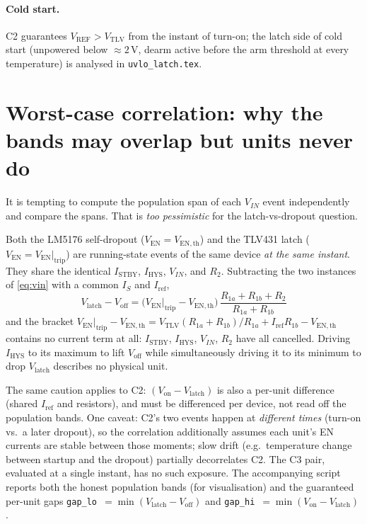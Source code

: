 \documentclass[11pt]{article}
\newcommand{\volt}{\mathrm{V}}\newcommand{\ampere}{\mathrm{A}}
\newcommand{\SI}[2]{\ensuremath{#1\,#2}}
\newcommand{\Ven}{V_{\mathrm{EN}}}
\newcommand{\Vref}{V_{\mathrm{REF}}}
\newcommand{\Vtlv}{V_{\mathrm{TLV}}}
\newcommand{\Vth}{V_{\mathrm{EN,th}}}
\newcommand{\Iref}{I_{\mathrm{ref}}}
\newcommand{\Istby}{I_{\mathrm{STBY}}}
\newcommand{\Ihys}{I_{\mathrm{HYS}}}
\newcommand{\Rone}{R_{1a}}
\newcommand{\Rtwo}{R_{1b}}
\newcommand{\Rt}{R_{2}}
\newcommand{\Von}{V_{\mathrm{on}}}
\newcommand{\Voff}{V_{\mathrm{off}}}
\newcommand{\Vlatch}{V_{\mathrm{latch}}}
\begin{document}
\paragraph{Cold start.} C2 guarantees $\Vref>\Vtlv$ from the instant of
turn-on; the latch side of cold start (unpowered below $\approx\SI{2}{\volt}$,
dearm active before the arm threshold at every temperature) is analysed in
\texttt{uvlo\_latch.tex}.

\section{Worst-case correlation: why the bands may overlap but units never do}
\label{sec:corr}

It is tempting to compute the population span of each $V_{IN}$ event
independently and compare the spans. That is \emph{too pessimistic} for the
latch-vs-dropout question.

Both the LM5176 self-dropout ($\Ven=\Vth$) and the TLV431 latch
($\Ven=\Ven|_{\mathrm{trip}}$) are running-state events of the same device
\emph{at the same instant}. They share the identical $\Istby$, $\Ihys$,
$V_{IN}$, and $\Rt$. Subtracting the two instances of \eqref{eq:vin} with a
common $I_S$ and $\Iref$,
\begin{equation}
\boxed{\;\Vlatch-\Voff
=\big(\Ven|_{\mathrm{trip}}-\Vth\big)\,\frac{\Rone+\Rtwo+\Rt}{\Rone+\Rtwo}\;}
\label{eq:gap}
\end{equation}
and the bracket
$\Ven|_{\mathrm{trip}}-\Vth=\Vtlv(\Rone+\Rtwo)/\Rone+\Iref\Rtwo-\Vth$
contains no current term at all: $\Istby$, $\Ihys$, $V_{IN}$, $\Rt$ have all
cancelled. Driving $\Ihys$ to its maximum to lift $\Voff$ while simultaneously
driving it to its minimum to drop $\Vlatch$ describes no physical unit.

The same caution applies to C2: $(\Von-\Vlatch)$ is also a per-unit
difference (shared $\Iref$ and resistors), and must be differenced per device,
not read off the population bands. One caveat: C2's two events happen at
\emph{different times} (turn-on vs.\ a later dropout), so the correlation
additionally assumes each unit's EN currents are stable between those moments;
slow drift (e.g.\ temperature change between startup and the dropout)
partially decorrelates C2. The C3 pair, evaluated at a single instant, has no
such exposure. The accompanying script reports both the honest population
bands (for visualisation) and the guaranteed per-unit gaps
\texttt{gap\_lo}~$=\min(\Vlatch-\Voff)$ and
\texttt{gap\_hi}~$=\min(\Von-\Vlatch)$.
\end{document}
